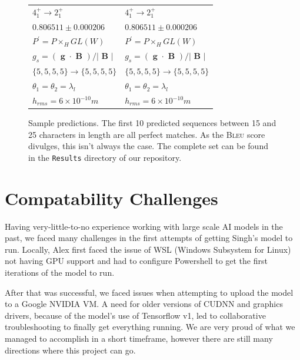 \documentclass[12pt]{article}
\newcommand{\BLEU}{\textsc{Bleu}}
\begin{document}
\begin{appendix}
\begin{figure}[!ht]
\begin{center}
\begin{longtable}{ l l }
$4 _ { 1 } ^ { + } \rightarrow 2 _ { 1 } ^ { + } $&$4 _ { 1 } ^ { + } \rightarrow 2 _ { 1 } ^ { + } $ \\
$0 . 8 0 6 5 1 1 \pm 0 . 0 0 0 2 0 6 $&$0 . 8 0 6 5 1 1 \pm 0 . 0 0 0 2 0 6 $ \\
$P ^ { \prime } = P \times _ { H } G L ( W ) $&$P ^ { \prime } = P \times _ { H } G L ( W ) $ \\
$g _ { s } = ( \textbf { g } \cdot \textbf { B } ) / | \textbf { B } | $&$g _ { s } = ( \textbf { g } \cdot \textbf { B } ) / | \textbf { B } | $ \\
$\{ 5 , 5 , 5 , 5 \} \to \{ 5 , 5 , 5 , 5 \} $&$\{ 5 , 5 , 5 , 5 \} \to \{ 5 , 5 , 5 , 5 \} $ \\
$\theta _ { 1 } = \theta _ { 2 } = \lambda _ { l } $&$\theta _ { 1 } = \theta _ { 2 } = \lambda _ { l } $ \\
$h _ { r m s } = 6 \times 1 0 ^ { - 1 0 } m $&$h _ { r m s } = 6 \times 1 0 ^ { - 1 0 } m $ \\
\bottomrule
\end{longtable}
\end{center}
\caption{Sample predictions. The first 10 predicted sequences between 15 and 25
characters in length are all perfect matches. As the \BLEU{} score divulges,
this isn't always the case. The complete set can be found in the
\texttt{Results} directory of our repository. }
\end{figure}
    \section{Compatability Challenges}

      Having very-little-to-no experience working with large scale AI models in
      the past, we faced many challenges in the first attempts of getting
      Singh's model to run. Locally, Alex first faced the issue of WSL (Windows
      Subsystem for Linux) not having GPU support and had to configure
      Powershell to get the first iterations of the model to run.
      
      After that was successful, we faced issues when attempting to upload the
      model to a Google NVIDIA VM. A need for older versions of CUDNN and
      graphics drivers, because of the model's use of Tensorflow v1, led to
      collaborative troubleshooting to finally get everything running. We are
      very proud of what we managed to accomplish in a short timeframe, however
      there are still many directions where this project can go.


\end{appendix}
\end{document}
